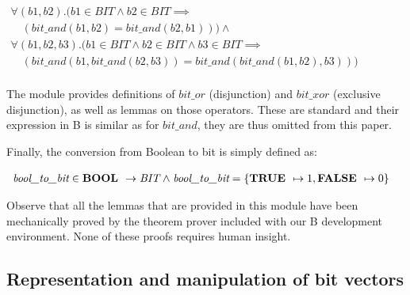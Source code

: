 \documentclass[a4paper]{llncs}
\begin{document}
$
\begin{array}{l}
\forall (\textit{b1},\textit{b2}).(\textit{b1} \in \textit{BIT} \land \textit{b2} \in \textit{BIT} \implies \\
\quad (\textit{bit\_and}(\textit{b1}, \textit{b2}) = \textit{bit\_and}(\textit{b2},\textit{b1})))\land \\
\forall (\textit{b1},\textit{b2},\textit{b3}).(\textit{b1} \in \textit{BIT} \land  \textit{b2} \in \textit{BIT} \land \textit{b3} \in \textit{BIT} \implies \\
\quad (\textit{bit\_and}(\textit{b1}, \textit{bit\_and}(\textit{b2},\textit{b3})) = \textit{bit\_and}(\textit{bit\_and}(\textit{b1},\textit{b2}),\textit{b3})))\\
\end{array}
$

The module provides definitions of $\textit{bit\_or}$ (disjunction)
and $\textit{bit\_xor}$ (exclusive disjunction), as well as lemmas on
those operators. These are standard and their expression in B is
similar as for $\textit{bit\_and}$, they are thus omitted from this paper.

Finally, the conversion from Boolean to bit is simply defined as:

$
\begin{array}{l}
\textit{bool\_to\_bit} \in \textbf{BOOL } \rightarrow \textit{BIT} \mathrel{\wedge} \textit{bool\_to\_bit} = \{ \textbf{TRUE } \mapsto 1, \textbf{FALSE } \mapsto 0 \} \\
\end{array}
$

Observe that all the lemmas that are provided in this module have been
mechanically proved by the theorem prover included with our B
development environment. None of these proofs requires human insight.


\subsection{Representation and manipulation of bit vectors}
\label{subsec:HardwareLibrary2}
\end{document}
